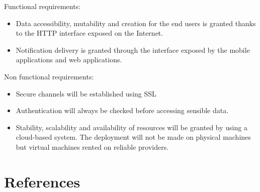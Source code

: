 \documentclass{article}
\begin{document}
Functional requirements:
\begin{itemize}
	\item Data accessibility, mutability and creation for the end users is granted thanks to the HTTP interface exposed on the Internet.
	\item Notification delivery is granted through the interface exposed by the mobile applications and web applications.
\end{itemize}
Non functional requirements:
\begin{itemize}
	\item Secure channels will be established using SSL 
	\item Authentication will always be checked before accessing sensible data.
	\item Stability, scalability and availability of resources will be granted by using a cloud-based system. The deployment will not be made on physical machines but virtual machines rented on reliable providers.
\end{itemize}
\section{References}
\clearpage
\end{document}
